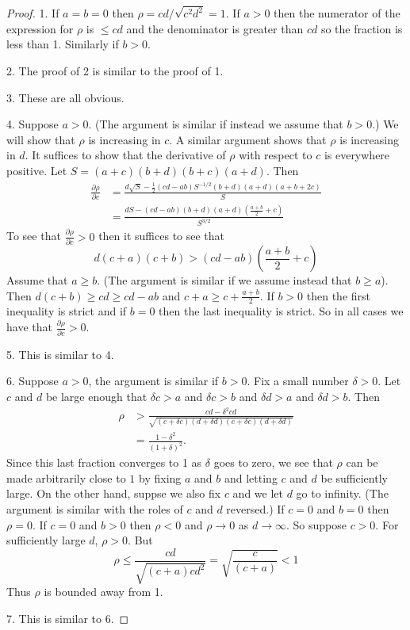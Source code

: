 \documentclass{article}
\begin{document}
\begin{proof}
1. If $a=b=0$ then $\rho=cd/\sqrt{c^2d^2}=1$. If $a>0$ then the numerator of the
expression for $\rho$ is $\leq cd$ and the denominator is greater than $cd$ so
the fraction is less than 1. Similarly if $b>0$.

2.  The proof of 2 is similar to the proof of 1.

3.  These are all obvious.

4. Suppose $a>0$. (The argument is similar if instead we assume that $b>0$.) We
will show that $\rho$ is increasing in $c$. A similar argument shows that $\rho$
is increasing in $d$. It suffices to show that the derivative of $\rho$ with
respect to $c$ is everywhere positive. Let $S=(a+c)(b+d)(b+c)(a+d)$. Then
\begin{equation}
\begin{split}
\frac{\partial \rho}{\partial c} &= \frac{d\sqrt{S} -
\frac{1}{2}(cd-ab)S^{-1/2}(b+d)(a+d)(a+b+2c)}{S}\\ 
&= \frac{dS - (cd-ab)(b+d)(a+d)\left(\frac{a+b}{2}+c\right)}{S^{3/2}}
\end{split}
\end{equation}
To see that $\frac{\partial \rho}{\partial c}>0$ then it suffices to see that
\begin{equation}
d(c+a)(c+b)>(cd-ab)\left(\frac{a+b}{2}+c\right)
\end{equation}
Assume that $a\geq b$. (The argument is similar if we assume instead that $b\geq
a$). Then $d(c+b)\geq cd\geq cd-ab$ and $c + a \geq c + \frac{a+b}{2}$.
If $b>0$ then the first inequality is strict and if $b=0$ then the last
inequality is strict. So in all cases we have that $\frac{\partial
\rho}{\partial c}>0$. 

5. This is similar to 4.

6. Suppose $a>0$, the argument is similar if $b>0$. Fix a small number
$\delta>0$. Let $c$ and $d$ be large enough that $\delta c>a$ and $\delta c>b$
and $\delta d>a$ and $\delta d>b$. Then
\begin{equation}
\begin{split}
\rho &> \frac{cd - \delta^2 cd}{\sqrt{(c+\delta c)(d+\delta d)(c+\delta
c)(d+\delta d)}}\\ 
&= \frac{1-\delta^2}{(1+\delta)^2}.
\end{split}
\end{equation}
Since this last fraction converges to 1 as $\delta$ goes to zero, we see that $\rho$
can be made arbitrarily close
to $1$ by fixing $a$ and $b$ and letting $c$ and $d$ be sufficiently large. On
the other hand, suppse we also fix $c$ and we let $d$ go to infinity. (The
argument is similar with the roles of $c$ and $d$ reversed.) If $c=0$ and $b=0$
then $\rho=0$. If $c=0$ and $b>0$ then $\rho<0$ and $\rho\to 0$ as $d\to\infty$.
So suppose $c>0$. For sufficiently large $d$, $\rho>0$. But
\begin{equation}
\rho \leq \frac{cd}{\sqrt{(c+a)cd^2}} = \sqrt{\frac{c}{(c+a)}} <1
\end{equation}
Thus $\rho$ is bounded away from 1.

7. This is similar to 6.
\end{proof}
\end{document}
